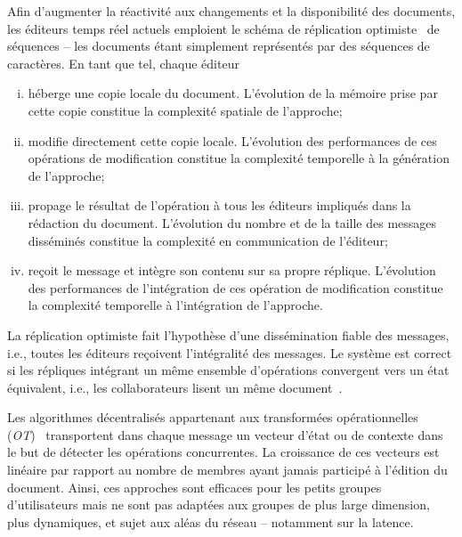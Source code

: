 Afin d'augmenter la réactivité aux changements et la disponibilité des
documents, les éditeurs temps réel actuels emploient le schéma de réplication
optimiste~\cite{demers1987epidemic, ladin1992providing, saito2005optimistic,
sun1998achieving} de séquences -- les documents étant simplement représentés par
des séquences de caractères. En tant que tel, chaque éditeur
\begin{enumerate}[(i)] 
\item héberge une copie locale du document. L'évolution de la mémoire prise par
cette copie constitue la complexité spatiale de l'approche;

\item modifie directement cette copie locale. L'évolution des performances de
ces opérations de modification constitue la complexité temporelle à la
génération de l'approche;

\item propage le résultat de l'opération à tous les éditeurs impliqués dans la
rédaction du document. L'évolution du nombre et de la taille des messages
disséminés constitue la complexité en communication de l'éditeur;

\item reçoit le message et intègre son contenu sur sa propre
réplique. L'évolution des performances de l'intégration de ces opération de
modification constitue la complexité temporelle à l'intégration de l'approche.
\end{enumerate}

\noindent La réplication optimiste fait l'hypothèse d'une dissémination fiable
des messages, i.e., toutes les éditeurs reçoivent l'intégralité des messages. Le
système est correct si les répliques intégrant un même ensemble d'opérations
convergent vers un état équivalent, i.e., les collaborateurs lisent un même
document~\cite{bailis2013eventual, shapiro2011conflict}.

Les algorithmes décentralisés appartenant aux transformées opérationnelles
(\emph{OT})~\cite{sun1998operational, sun2009contextbased} transportent dans
chaque message un vecteur d'état ou de contexte dans le but de détecter les
opérations concurrentes. La croissance de ces vecteurs est linéaire par rapport
au nombre de membres ayant jamais participé à l'édition du document. Ainsi, ces
approches sont efficaces pour les petits groupes d'utilisateurs mais ne sont pas
adaptées aux groupes de plus large dimension, plus dynamiques, et sujet aux
aléas du réseau -- notamment sur la latence.

